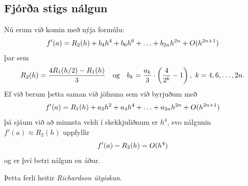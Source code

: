 \documentclass[A4paper,10pt,icelandic]{sphinxmanual}
\begin{document}
\subsection{Fjórða stigs nálgun}
\label{kafli04:fjora-stigs-nalgun}
Nú erum við komin með nýja formúlu:
\begin{gather}
\begin{split}f'(a) = R_2(h) + b_4 h^4 + b_6 h^6 + \ldots + b_{2n} h^{2n}
  + O(h^{2n+1})\end{split}\notag
\end{gather}
þar sem
\begin{gather}
\begin{split}R_2(h) = \frac{4 R_1(h/2) - R_1(h)}{3}
  \quad \text{og} \quad
  b_k = \frac{a_k}{3} \cdot \left(\frac{4}{2^k}-1\right),
  \  k = 4,6,\ldots,2n.\end{split}\notag
\end{gather}
Ef við berum þetta saman við jöfnuna sem við byrjuðum með
\begin{gather}
\begin{split}f'(a) = R_1(h)
  + a_2 h^2 + a_4 h^4 + \ldots + a_{2n} h^{2n} + O(h^{2n+1})\end{split}\notag
\end{gather}
þá sjáum við að minnsta veldi í skekkjuliðnum er \(h^4\), svo
nálgunin \(f'(a)
\approx R_2(h)\) uppfyllir
\begin{gather}
\begin{split}f'(a) - R_2(h) = O(h^4)\end{split}\notag
\end{gather}
og er því betri nálgun en áður.

Þetta ferli heitir \emph{Richardson útgiskun}.
\end{document}
